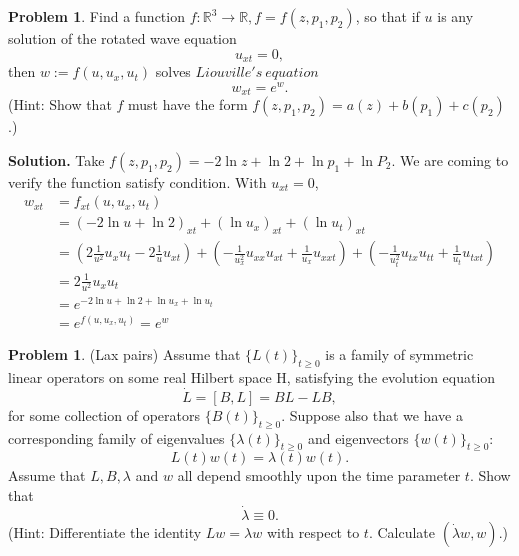 \documentclass[a4paper]{book}
\newenvironment{solution}%
{\noindent\textbf{Solution.}}%
{\qedhere}
\numberwithin{equation}{chapter}
\theoremstyle{definition}
\newtheorem{pro}[exm]{Problem}
\begin{document}
\begin{pro}
  Find a function $f \colon \mathbb{R}^3 \rightarrow \mathbb{R}, f = f(z, p_1,p_2)$, so that if $u$ is any solution of the rotated wave equation
  \[u_{xt} = 0,\]
  then $w := f(u,u_x,u_t)$ solves $Liouville's\ equation$
  \[ w_{xt} = e^w.\]
  (Hint: Show that $f$ must have the form $f(z,p_1,p_2) = a(z) + b(p_1) + c(p_2)$.)
\end{pro}

\begin{solution}
  Take $f(z, p_1,p_2) = -2 \ln z + \ln 2 + \ln p_1 + \ln P_2 $. We are coming to verify the function satisfy condition. With $u_{xt} = 0$,
  \begin{align*}
    w_{xt} &= f_{xt}(u,u_x,u_t) \\
           &=(-2 \ln u + \ln 2)_{xt} + (\ln u_x)_{xt} + (\ln u_t)_{xt} \\
           &= (2 \frac{1}{u^2} u_{x}u_{t} - 2 \frac{1}{u} u_{xt}) + (-\frac{1}{u_x^2} u_{xx}u_{xt} + \frac{1}{u_x} u_{xxt} ) + (-\frac{1}{u_t^2} u_{tx}u_{tt} + \frac{1}{u_t} u_{txt} ) \\
           &= 2 \frac{1}{u^2} u_{x}u_{t} \\
           &= e^{-2 \ln u + \ln 2 + \ln u_x + \ln u_t} \\
    &= e^{f(u,u_x,u_t)} = e^w
  \end{align*}
\end{solution}

\begin{pro}
  (Lax pairs) Assume that $\{L(t)\}_{t \geq 0}$ is a family of symmetric linear operators on some real Hilbert space H, satisfying the evolution equation
  \[\dot{L} = [B,L] = BL - LB,\]
  for some collection of operators $\{B(t)\}_{t \geq 0}$. Suppose also that we have a corresponding family of eigenvalues $\{\lambda(t)\}_{t \geq 0}$ and eigenvectors $\{w(t)\}_{t \geq 0}$:
  \[L(t)w(t) = \lambda(t)w(t).\]
  Assume that $L,B,\lambda$ and $w$ all depend smoothly upon the time parameter $t$.
  Show that
  \[\dot{\lambda} \equiv 0.\]
  (Hint: Differentiate the identity $Lw = \lambda w$ with respect to $t$. Calculate $(\dot{\lambda}w, w)$.)
\end{pro}
\end{document}
